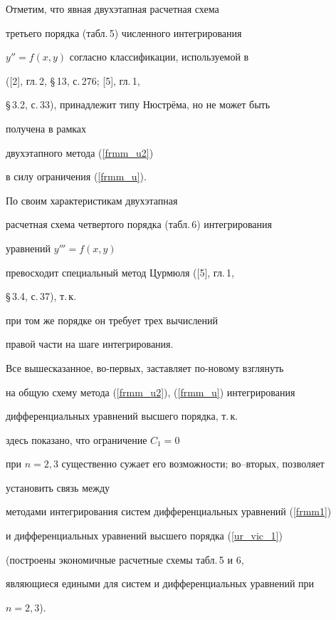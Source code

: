 \medskip





Отметим, что явная двухэтапная расчетная схема


третьего порядка (табл.\,5) численного интегрирования


$y''=f(x,y)$ согласно классификации, используемой в


([2], гл.\,2, \S\,13, с.\,276; [5], гл.\,1,


\S\,3.2, с.\,33), принадлежит типу Нюстр\"ема, но не может быть 


получена в рамках


двухэтапного метода (\ref{frmm_u2})


в силу ограничения (\ref{frmm_u}).





По своим характеристикам двухэтапная


расчетная схема четвертого порядка (табл.\,6) интегрирования


уравнений $y'''=f(x,y)$


превосходит специальный метод Цурмюля ([5], гл.\,1,


\S\,3.4, с.\,37), т.\,к.


при том же порядке он требует трех вычислений


правой части на шаге интегрирования.





Все вышесказанное, во-первых, заставляет по-новому взглянуть


на общую схему метода (\ref{frmm_u2}), (\ref{frmm_u}) интегрирования


дифференциальных уравнений высшего порядка, т.\,к.


здесь показано, что ограничение $C_{1} =0$


при $n=2,3$ существенно сужает его возможности; во--вторых, позволяет


установить связь между


методами интегрирования систем дифференциальных уравнений (\ref{frmm1})


и дифференциальных уравнений высшего порядка (\ref{ur_vic_1})


(построены экономичные расчетные схемы табл.\,5 и 6,


являющиеся едиными для систем и дифференциальных уравнений при


$n=2,3$). 








